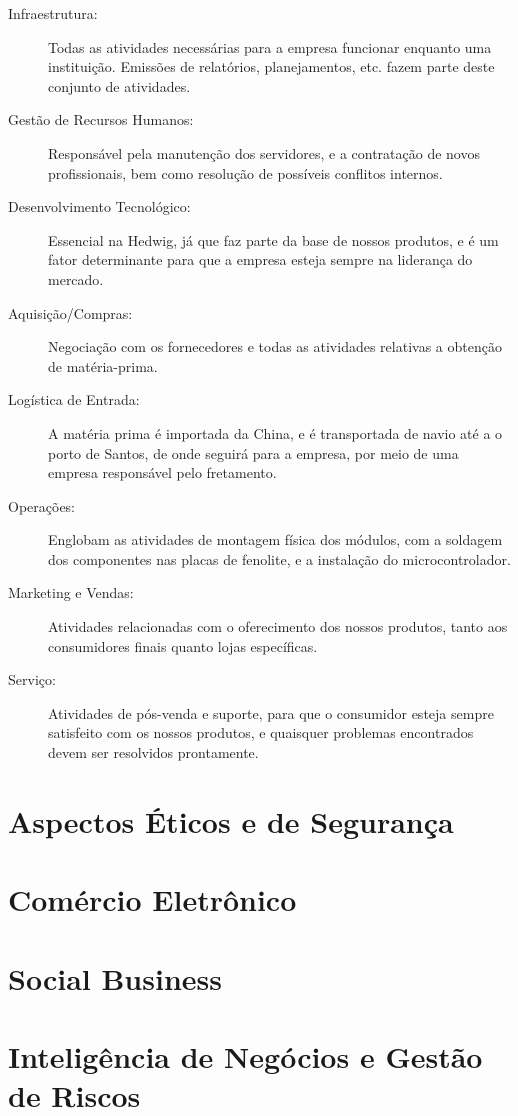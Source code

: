 \begin{description}
    \item[Infraestrutura:]Todas as atividades necessárias para a empresa funcionar enquanto uma instituição. Emissões de relatórios, planejamentos, etc. fazem parte deste conjunto de atividades.

    \item[Gestão de Recursos Humanos:]Responsável pela manutenção dos servidores, e a contratação de novos profissionais, bem como resolução de possíveis conflitos internos.

    \item[Desenvolvimento Tecnológico:]Essencial na Hedwig, já que faz parte da base de nossos produtos, e é um fator determinante para que a empresa esteja sempre na liderança do mercado.

    \item[Aquisição/Compras:]Negociação com os fornecedores e todas as atividades relativas a obtenção de matéria-prima.

    \item[Logística de Entrada:]A matéria prima é importada da China, e é transportada de navio até a o porto de Santos, de onde seguirá para a empresa, por meio de uma empresa responsável pelo fretamento.

    \item[Operações:]Englobam as atividades de montagem física dos módulos, com a soldagem dos componentes nas placas de fenolite, e a instalação do microcontrolador.

    \item[Marketing e Vendas:]Atividades relacionadas com o oferecimento dos nossos produtos, tanto aos consumidores finais quanto lojas específicas.

    \item[Serviço:]Atividades de pós-venda e suporte, para que o consumidor esteja sempre satisfeito com os nossos produtos, e quaisquer problemas encontrados devem ser resolvidos prontamente.
\end{description}

\section{Aspectos Éticos e de Segurança}


\section{Comércio Eletrônico}


\section{Social Business}


\section{Inteligência de Negócios e Gestão de Riscos}

